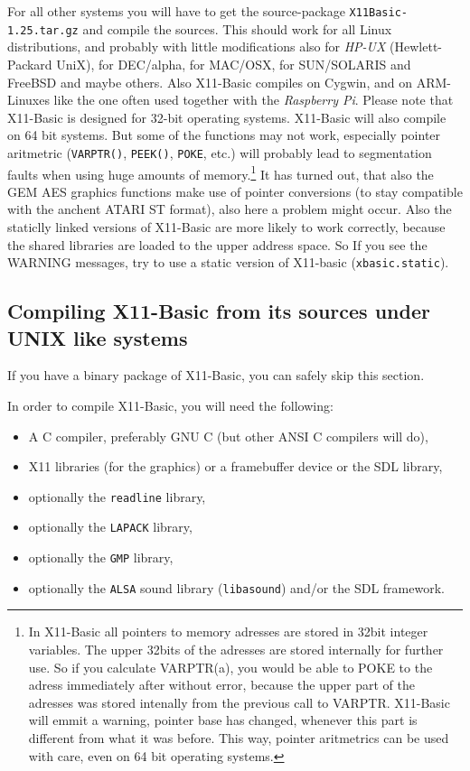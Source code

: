 For all other systems you will have to get the source-package 
\verb|X11Basic-1.25.tar.gz| and compile the sources. This should work for  all
Linux distributions, and probably with little modifications also for {\it
HP-UX} (Hewlett-Packard UniX), for DEC/alpha, for MAC/OSX, for SUN/SOLARIS and
FreeBSD and maybe others.  Also X11-Basic compiles on Cygwin, and on
ARM-Linuxes like the one often used together with the {\it Raspberry Pi}. 
Please note that X11-Basic is designed for 32-bit operating systems. 
X11-Basic will also compile on 64 bit systems. But some of the
functions may not work, especially pointer aritmetric (\verb|VARPTR()|, 
\verb|PEEK()|, \verb|POKE|, etc.)
will probably lead to segmentation faults when using huge amounts of 
memory.\footnote{In X11-Basic all pointers to memory adresses are stored in 
32bit integer variables. The upper 32bits of the adresses are stored internally
for further use. So if you calculate VARPTR(a), you would be able to 
POKE to the adress immediately after without error, because the upper part of 
the adresses was stored intenally from the previous call to VARPTR. 
X11-Basic will emmit a warning, 
pointer base has changed, whenever this part is different from what it 
was before. This way, pointer aritmetrics can be used with care, even on 64 bit 
operating systems.} It has turned out, that also the GEM AES graphics functions 
make use of pointer conversions (to stay compatible with the anchent ATARI ST format), 
also here a problem might occur. Also the staticlly linked versions of X11-Basic are
more likely to work correctly, because the shared libraries are loaded to the upper
address space. So If you see the WARNING messages, try to use a static version of 
X11-basic (\verb|xbasic.static|). 

\subsection*{Compiling X11-Basic from its sources under UNIX like systems}

If you have a binary package of X11-Basic, you can safely skip this section.

In order to compile X11-Basic, you will need the following:

\begin{itemize}
 \item A C compiler, preferably GNU C (but other ANSI C compilers will do), 
 \item X11 libraries  (for the graphics) or a framebuffer device or the SDL library,
 \item optionally the \verb|readline| library, 
 \item optionally the \verb|LAPACK| library,
 \item optionally the \verb|GMP| library,  
 \item optionally the \verb|ALSA| sound library (\verb|libasound|) and/or the SDL framework.
\end{itemize}  

